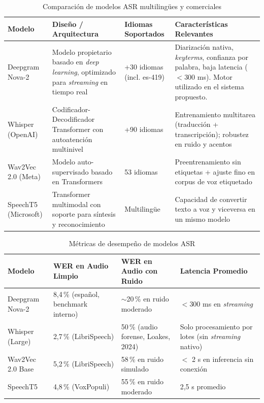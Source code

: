 \documentclass[12pt,a4paper,oneside]{report}
\begin{document}
\begin{table}[H]
\centering
\caption{Comparación de modelos ASR multilingües y comerciales}
\begin{tabular}{|p{2.5cm}|p{4cm}|p{2.5cm}|p{3.5cm}|}
\hline
\rowcolor{gray!20}
\textbf{Modelo} & \textbf{Diseño / Arquitectura} & \textbf{Idiomas Soportados} & \textbf{Características Relevantes} \\
\hline
Deepgram Nova-2 & Modelo propietario basado en \textit{deep learning}, optimizado para \textit{streaming} en tiempo real & +30 idiomas (incl. es-419) & Diarización nativa, \textit{keyterms}, confianza por palabra, baja latencia ($< 300$ ms). Motor utilizado en el sistema propuesto. \\
\hline
Whisper (OpenAI) & Codificador-Decodificador Transformer con autoatención multinivel & +90 idiomas & Entrenamiento multitarea (traducción + transcripción); robustez en ruido y acentos \\
\hline
Wav2Vec 2.0 (Meta) & Modelo auto-supervisado basado en Transformers & 53 idiomas & Preentrenamiento sin etiquetas + ajuste fino en corpus de voz etiquetado \\
\hline
SpeechT5 (Microsoft) & Transformer multimodal con soporte para síntesis y reconocimiento & Multilingüe & Capacidad de convertir texto a voz y viceversa en un mismo modelo \\
\hline
\end{tabular}
\label{tab:transformers}
\end{table}

\begin{table}[H]
\centering
\caption{Métricas de desempeño de modelos ASR}
\begin{tabular}{|p{2.5cm}|p{3.5cm}|p{3.5cm}|p{2.5cm}|}
\hline
\rowcolor{gray!20}
\textbf{Modelo} & \textbf{WER en Audio Limpio} & \textbf{WER en Audio con Ruido} & \textbf{Latencia Promedio} \\
\hline
Deepgram Nova-2 & 8,4\,\% (español, benchmark interno) & $\sim$20\,\% en ruido moderado & $< 300$ ms en \textit{streaming} \\
\hline
Whisper (Large) & 2,7\,\% (LibriSpeech) & 50\,\% (audio forense, Loakes, 2024) & Solo procesamiento por lotes (sin \textit{streaming} nativo) \\
\hline
Wav2Vec 2.0 Base & 5,2\,\% (LibriSpeech) & 58\,\% en ruido simulado & $<$ 2 s en inferencia sin conexión \\
\hline
SpeechT5 & 4,8\,\% (VoxPopuli) & 55\,\% en ruido moderado & 2,5 s promedio \\
\hline
\end{tabular}
\label{tab:metricas_transformers}
\end{table}
\end{document}

